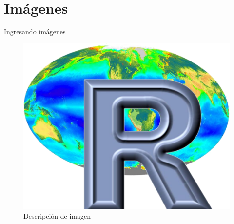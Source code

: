 \documentclass[10pt]{beamer}%
\begin{document}
\section{Imágenes} %
\begin{frame}{Ingresando imágenes}
	\begin{figure}[!h]
		\centering
		\includegraphics[scale=0.2]{gis2r}
		\caption{Descripción de imagen}
		\label{fig:gis2r}
	\end{figure}
\end{frame}
\end{document}

